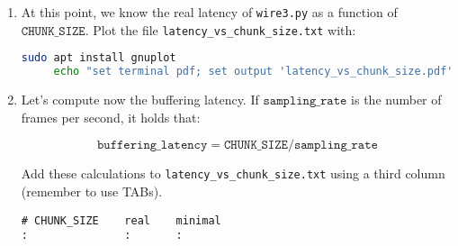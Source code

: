 \begin{enumerate}
\begin{enumerate}
  \item Use the
    \href{https://manual.audacityteam.org/man/edit_toolbar.html#zoom_to_selection}{zoom
      to selection buttom} to zoom-in the selected area.

  \item Measure the time between the ocurrence of the sound and
    it's first replica. This time is the real latency of your computer
    runing \texttt{wire3.py}.

  \item Modify the constant $\mathtt{CHUNK\_SIZE}$ and repeat this
    process, starting at the Step \ref{start_point}. Create an ASCII
    file (\texttt{latency\_vs\_chunk\_size.txt}) with the content (use
    tabulators to space the columns):
\begin{verbatim}
# CHUNK_SIZE    real
32              ...
64              ...
128             ...
256             ...
512             ...
1024            ...
2048            ...
4096            ...
8192            ...
\end{verbatim}

  \end{enumerate}

\item At this point, we know the real latency of \texttt{wire3.py} as
  a function of $\mathtt{CHUNK\_SIZE}$. Plot the file
  \texttt{latency\_vs\_chunk\_size.txt} with:

  \begin{lstlisting}[language=Bash, showstringspaces=false, upquote=true]
     sudo apt install gnuplot
     echo "set terminal pdf; set output 'latency_vs_chunk_size.pdf'; set xlabel 'CHUNK\_SIZE (frames)'; set ylabel 'Latency (seconds)'; plot 'latency_vs_chunk_size.txt' title '' with linespoints" | gnuplot
  \end{lstlisting}

\item Let's compute now the buffering latency. If
  $\mathtt{sampling\_rate}$ is the number of frames per second, it holds
  that:
  
  \begin{equation}
    \mathtt{buffering\_latency} = \mathtt{CHUNK\_SIZE} / \mathtt{sampling\_rate}
  \end{equation}

  Add these calculations to \texttt{latency\_vs\_chunk\_size.txt} using
  a third column (remember to use TABs).
\begin{verbatim}
# CHUNK_SIZE    real    minimal
:               :       :
\end{verbatim}


\end{enumerate}
